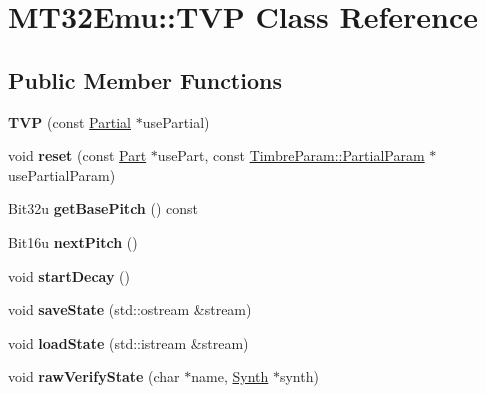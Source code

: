 \hypertarget{classMT32Emu_1_1TVP}{\section{M\-T32\-Emu\-:\-:T\-V\-P Class Reference}
\label{classMT32Emu_1_1TVP}
}
\subsection*{Public Member Functions}
\begin{DoxyCompactItemize}
\item 
\hypertarget{classMT32Emu_1_1TVP_a3c7c3fca71c0b7886f0f3d7cbee670f2}{{\bfseries T\-V\-P} (const \hyperlink{classMT32Emu_1_1Partial}{Partial} $\ast$use\-Partial)}\label{classMT32Emu_1_1TVP_a3c7c3fca71c0b7886f0f3d7cbee670f2}

\item 
\hypertarget{classMT32Emu_1_1TVP_a9a4fb3c57db2aa0d08f0fa0ee55a1d6a}{void {\bfseries reset} (const \hyperlink{classMT32Emu_1_1Part}{Part} $\ast$use\-Part, const \hyperlink{structMT32Emu_1_1TimbreParam_1_1PartialParam}{Timbre\-Param\-::\-Partial\-Param} $\ast$use\-Partial\-Param)}\label{classMT32Emu_1_1TVP_a9a4fb3c57db2aa0d08f0fa0ee55a1d6a}

\item 
\hypertarget{classMT32Emu_1_1TVP_af349ddf87e05b471ad973a7c47413607}{Bit32u {\bfseries get\-Base\-Pitch} () const }\label{classMT32Emu_1_1TVP_af349ddf87e05b471ad973a7c47413607}

\item 
\hypertarget{classMT32Emu_1_1TVP_a312b2971f2fb7ee753df1866fa332594}{Bit16u {\bfseries next\-Pitch} ()}\label{classMT32Emu_1_1TVP_a312b2971f2fb7ee753df1866fa332594}

\item 
\hypertarget{classMT32Emu_1_1TVP_a6dc67707b7ce67f2bb14cf7b4ee3479d}{void {\bfseries start\-Decay} ()}\label{classMT32Emu_1_1TVP_a6dc67707b7ce67f2bb14cf7b4ee3479d}

\item 
\hypertarget{classMT32Emu_1_1TVP_a7389cd7a8146ac51c1c245e76bdcb57c}{void {\bfseries save\-State} (std\-::ostream \&stream)}\label{classMT32Emu_1_1TVP_a7389cd7a8146ac51c1c245e76bdcb57c}

\item 
\hypertarget{classMT32Emu_1_1TVP_add92fd27670377df57ac6793f597ec59}{void {\bfseries load\-State} (std\-::istream \&stream)}\label{classMT32Emu_1_1TVP_add92fd27670377df57ac6793f597ec59}

\item 
\hypertarget{classMT32Emu_1_1TVP_a3e2fd3c6c8aacaa51334cab01de49d9a}{void {\bfseries raw\-Verify\-State} (char $\ast$name, \hyperlink{classMT32Emu_1_1Synth}{Synth} $\ast$synth)}\label{classMT32Emu_1_1TVP_a3e2fd3c6c8aacaa51334cab01de49d9a}

\end{DoxyCompactItemize}


